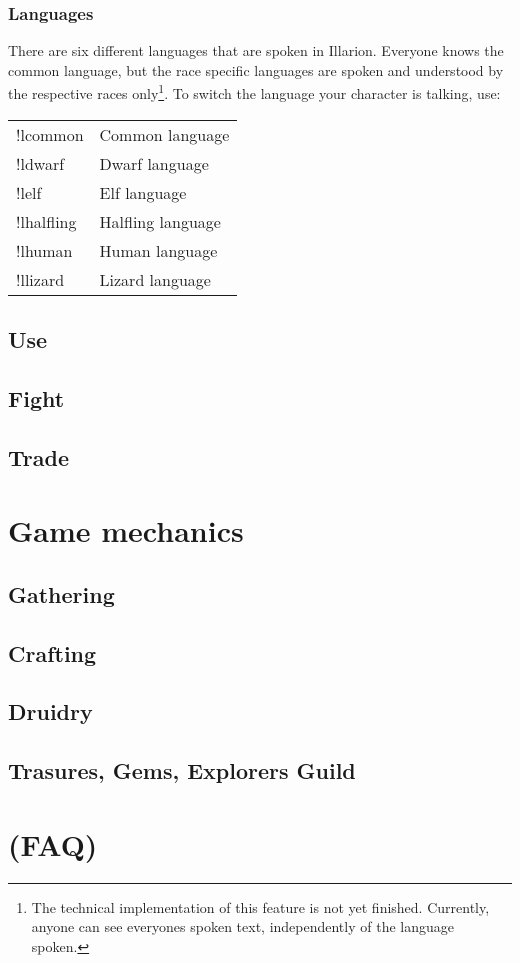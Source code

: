 \documentclass[a4paper,11pt]{scrreprt}
\begin{document}
\subsection{Languages}
There are six different languages that are spoken in Illarion. Everyone knows the common language, but the race specific languages are spoken and understood by the respective races only\footnote{The technical implementation of this feature is not yet finished. Currently, anyone can see everyones spoken text, independently of the language spoken.}. To switch the language your character is talking, use:
\begin{table}[h]
\begin{tabular}{ l l}
!lcommon & Common language \\
!ldwarf & Dwarf language \\
!lelf & Elf language \\
!lhalfling & Halfling language \\
!lhuman & Human language \\
!llizard & Lizard language
\end{tabular}
\end{table}


\section{Use}
\section{Fight}
\section{Trade}

\chapter{Game mechanics}
\section{Gathering}
\section{Crafting}
\section{Druidry}
\section{Trasures, Gems, Explorers Guild}

\chapter{(FAQ)}
\end{document}
